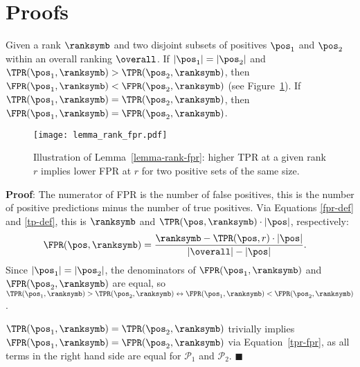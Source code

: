 \section{Proofs} \label{proofs}

\begin{lemma} \label{lemma-rank-fpr}
Given a rank $\ranksymb$ and two disjoint subsets of positives $\pos_1$ and $\pos_2$ within an overall ranking $\overall$. If $|\pos_1|=|\pos_2|$ and $\TPR(\pos_1, \ranksymb) > \TPR(\pos_2,\ranksymb)$, then $\FPR(\pos_1,\ranksymb) < \FPR(\pos_2,\ranksymb)$ (see Figure~\ref{fig:lemma-rank-fpr}). If $\TPR(\pos_1, \ranksymb) = \TPR(\pos_2,\ranksymb)$, then $\FPR(\pos_1, \ranksymb) = \FPR(\pos_2,\ranksymb)$.

\begin{figure}[!h]
  \centering
  \texttt{[image: lemma\_rank\_fpr.pdf]}
  \caption{Illustration of Lemma~\ref*{lemma-rank-fpr}: higher TPR at a given rank $r$ implies lower FPR at $r$ for two positive sets of the same size.}
  \label{fig:lemma-rank-fpr}
\end{figure}

\textbf{Proof}: The numerator of FPR is the number of false positives, this is the number of positive predictions minus the number of true positives. Via Equations \eqref{fpr-def} and \eqref{tp-def}, this is $\ranksymb$ and $\TPR(\pos,\ranksymb)\cdot|\pos|$, respectively:
\begin{align}
\FPR(\pos, \ranksymb) &= \frac{\ranksymb - \TPR(\pos, r) \cdot |\pos|}{|\overall|-|\pos|} \label{tpr-fpr}.
\end{align}
Since $|\pos_1|=|\pos_2|$, the denominators of $\FPR(\pos_1,\ranksymb)$ and $\FPR(\pos_2,\ranksymb)$ are equal, so $\TPR(\pos_1,\ranksymb)>\TPR(\pos_2,\ranksymb) \leftrightarrow \FPR(\pos_1,\ranksymb) < \FPR(\pos_2,\ranksymb)$.

$\TPR(\pos_1, \ranksymb) = \TPR(\pos_2,\ranksymb)$ trivially implies $\FPR(\pos_1, \ranksymb) = \FPR(\pos_2,\ranksymb)$ via Equation~\ref{tpr-fpr}, as all terms in the right hand side are equal for $\mathcal{P}_1$ and $\mathcal{P}_2$. \hfill$\blacksquare$
\end{lemma}


